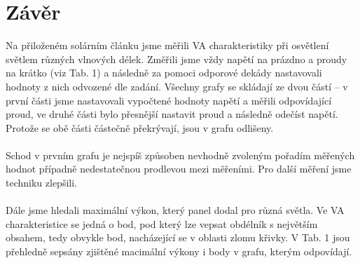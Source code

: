 \documentclass{protokol}
\begin{document}
\section{Závěr}
	Na přiloženém solárním článku jsme měřili VA charakteristiky při osvětlení světlem různých vlnových délek. Změřili jsme vždy napětí na prázdno a proudy na krátko (viz Tab. 1) a následně za pomoci odporové dekády nastavovali hodnoty z nich odvozené dle zadání.
	Všechny grafy se skládají ze dvou částí -- v první části jsme nastavovali vypočtené hodnoty napětí a měřili odpovídající proud, ve druhé části bylo přesnější nastavit proud a následně odečíst napětí. Protože se obě části částečně překrývají, jsou v grafu odlišeny.
	\\\\
	Schod v prvním grafu je nejspíš způsoben nevhodně zvoleným pořadím měřených hodnot případně nedestatečnou prodlevou mezi měřeními. Pro další měření jsme techniku zlepšili.
	\\\\ 
	Dále jsme hledali maximální výkon, který panel dodal pro různá světla. Ve VA charakteristice se jedná o bod, pod který lze vepsat obdélník s největším obsahem, tedy obvykle bod, nacházející se v oblasti zlomu křivky. V Tab. 1 jsou přehledně sepsány zjištěné macimální výkony i body v grafu, kterým odpovídají.
\end{document}

